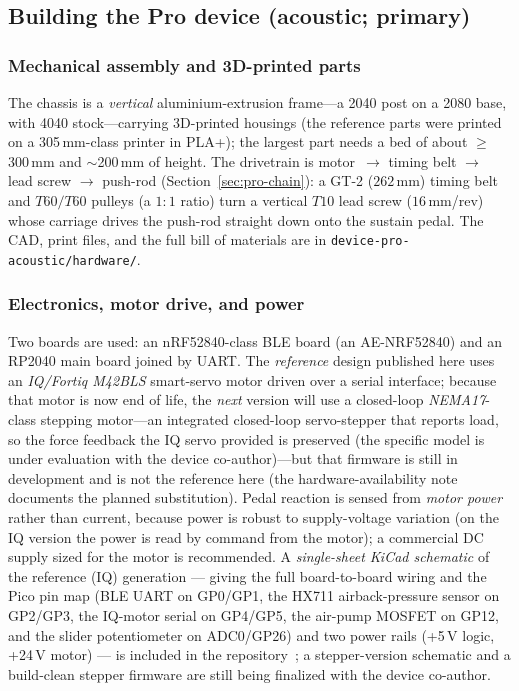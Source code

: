 \subsection{Building the Pro device (acoustic; primary)}
\label{sec:impl-pro}

\subsubsection{Mechanical assembly and 3D-printed parts}
\label{sec:impl-pro-mech}
The chassis is a \emph{vertical} aluminium-extrusion frame---a 2040 post on a 2080
base, with 4040 stock---carrying 3D-printed housings (the reference parts were
printed on a 305\,mm-class printer in PLA+); the largest part needs a bed of about
$\ge$300\,mm and $\sim$200\,mm of height. The drivetrain is
motor~$\rightarrow$ timing belt $\rightarrow$ lead screw $\rightarrow$ push-rod
(Section~\ref{sec:pro-chain}): a GT-2 ($262$\,mm) timing belt and $T60/T60$ pulleys
(a $1{:}1$ ratio) turn a vertical $T10$ lead screw ($16$\,mm/rev) whose carriage
drives the push-rod straight down onto the sustain pedal. The CAD, print files, and
the full bill of materials are in \texttt{device-pro-acoustic/hardware/}.

\subsubsection{Electronics, motor drive, and power}
\label{sec:impl-pro-elec}
Two boards are used: an nRF52840-class BLE board (an AE-NRF52840) and an RP2040
main board joined by UART. The \emph{reference} design published here uses an
\emph{IQ/Fortiq M42BLS} smart-servo motor driven over a serial interface; because
that motor is now end of life, the \emph{next} version will use a closed-loop
\emph{NEMA17}-class stepping motor---an integrated closed-loop servo-stepper that
reports load, so the force feedback the IQ servo provided is preserved (the
specific model is under evaluation with the device co-author)---but that firmware
is still in development and is not the reference here (the hardware-availability
note documents the planned substitution). Pedal reaction is sensed from
\emph{motor power} rather than current, because power is robust to supply-voltage
variation (on the IQ version the power is read by command from the motor); a
commercial DC supply sized for the motor is recommended. A \emph{single-sheet KiCad
schematic} of the reference (IQ) generation --- giving the full board-to-board
wiring and the Pico pin map (BLE UART on GP0/GP1, the HX711 airback-pressure sensor on GP2/GP3, the
IQ-motor serial on GP4/GP5, the air-pump MOSFET on GP12, and the slider
potentiometer on ADC0/GP26) and two power rails (+5\,V logic, +24\,V motor) ---
is included in the repository~\cite{repo}; a stepper-version schematic and a
build-clean stepper firmware are still being finalized with the device co-author.


